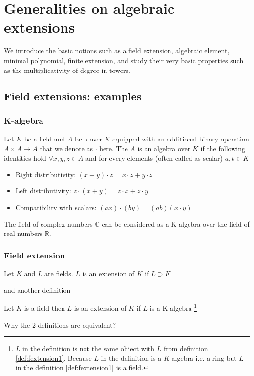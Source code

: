 \chapter{Generalities on algebraic extensions}
We introduce the basic notions such as a field extension, algebraic
element, minimal polynomial, finite extension, and study their very
basic properties such as the multiplicativity of degree in towers. 

\section{Field extensions: examples}

\subsection{K-algebra}
\begin{definition}[K-algebra]
  Let $K$ be a field and $A$ be a  over $K$
  equipped with 
  an additional binary operation $A \times A \rightarrow A$ that we
  denote as $\cdot$ here. The $A$ is an algebra over $K$ if the
  following identities hold $\forall x,y,z \in A$ and for every
  elements (often called as scalar) $a, b \in K$
  \begin{itemize}
  \item Right distributivity:
    $(x + y) \cdot z = x \cdot z + y \cdot z$
  \item Left distributivity:
    $z \cdot (x + y) = z \cdot x + z \cdot y$
  \item Compatibility with scalars:
    $(ax) \cdot (by) = (ab) (x \cdot y)$
  \end{itemize}
  \label{def:kalgebra}
\end{definition}

\begin{example}
  The field of complex numbers $\mathbb{C}$ can be considered as a
  K-algebra over the field of real numbers $\mathbb{R}$.
  \label{ex:complexnumbers}
\end{example}

\subsection{Field extension}

\begin{definition}
  Let $K$ and $L$ are fields.
  $L$ is an extension of $K$ if $L \supset K$
  \label{def:fextension1}
\end{definition}
and another definition
\begin{definition}
  Let $K$ is a field then
  $L$ is an extension of $K$ if $L$ is a K-algebra
  \footnote{
    $L$ in the definition is not the same object with $L$ from
    definition \ref{def:fextension1}. Because $L$ in the definition is
    a $K$-algebra i.e. a ring but $L$ in the definition
    \ref{def:fextension1} is a field. 
  }
  \label{def:fextension2}
\end{definition}
Why the 2 definitions are equivalent?

